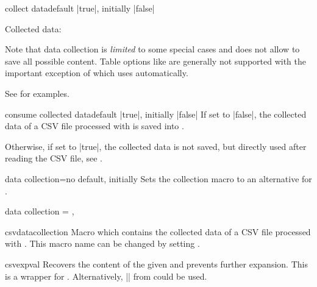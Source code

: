 \documentclass[a4paper,11pt]{ltxdoc}
\begin{document}
\begin{docCsvKey}[][doc new and updated={2021-07-06}{2023-10-17}]{collect data}{}{default |true|, initially |false|}
\begin{dispExample}
Collected data:\par
\csvdatacollection
\end{dispExample}

Note that data collection is \emph{limited} to some special cases and does not
allow to save all possible content. Table options like 
are generally not supported with the important exception of 
which uses  automatically.\par
See  for examples.
\end{docCsvKey}

\clearpage

\begin{docCsvKey}[][doc new={2023-12-18}]{consume collected data}{}{default |true|, initially |false|}
If set to |false|, the collected data of a CSV file processed with
 is saved into .\par
Otherwise, if set to |true|, the collected data is not saved, but directly used
after reading the CSV file, see .
\end{docCsvKey}


\begin{docCsvKey}[][doc new=2021-07-06]{data collection}{=}{no default, initially }
Sets the collection macro to an alternative for .
\begin{dispListing}
  data collection = \myData,    %
\end{dispListing}
\end{docCsvKey}


\begin{docCommand}[doc new=2021-07-06]{csvdatacollection}{}
  Macro which contains the collected data of a CSV file processed with
  . This macro name can be changed by
  setting .
\end{docCommand}


\begin{docCommand}[doc new and updated={2021-07-06}{2023-12-17}]{csvexpval}{}
  Recovers the content of the given  and prevents further
  expansion. This is a wrapper for .
  Alternatively, |\expandonce| from  could be used.
\end{docCommand}
\end{document}
